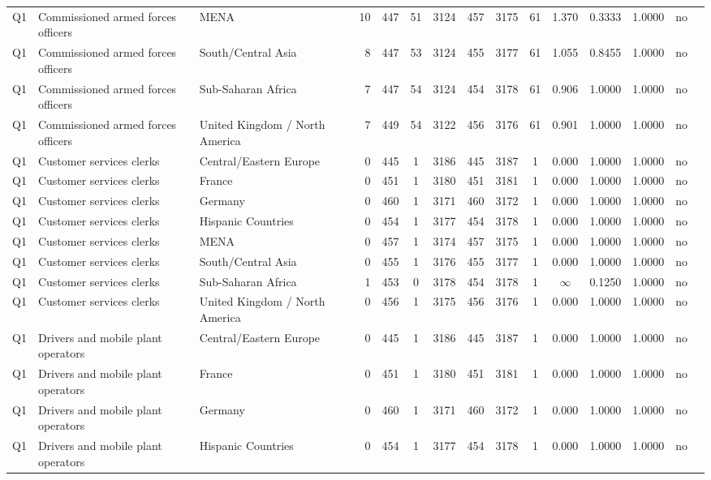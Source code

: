 \begin{longtable}{lllrcccccccccll}
Q1 & Commissioned armed forces officers & MENA & 10 & 447 & 51 & 3124 & 457 & 3175 & 61 & 1.370 & 0.3333 & 1.0000 & no \\
Q1 & Commissioned armed forces officers & South/Central Asia & 8 & 447 & 53 & 3124 & 455 & 3177 & 61 & 1.055 & 0.8455 & 1.0000 & no \\
Q1 & Commissioned armed forces officers & Sub-Saharan Africa & 7 & 447 & 54 & 3124 & 454 & 3178 & 61 & 0.906 & 1.0000 & 1.0000 & no \\
Q1 & Commissioned armed forces officers & United Kingdom / North America & 7 & 449 & 54 & 3122 & 456 & 3176 & 61 & 0.901 & 1.0000 & 1.0000 & no \\
Q1 & Customer services clerks & Central/Eastern Europe & 0 & 445 & 1 & 3186 & 445 & 3187 & 1 & 0.000 & 1.0000 & 1.0000 & no \\
Q1 & Customer services clerks & France & 0 & 451 & 1 & 3180 & 451 & 3181 & 1 & 0.000 & 1.0000 & 1.0000 & no \\
Q1 & Customer services clerks & Germany & 0 & 460 & 1 & 3171 & 460 & 3172 & 1 & 0.000 & 1.0000 & 1.0000 & no \\
Q1 & Customer services clerks & Hispanic Countries & 0 & 454 & 1 & 3177 & 454 & 3178 & 1 & 0.000 & 1.0000 & 1.0000 & no \\
Q1 & Customer services clerks & MENA & 0 & 457 & 1 & 3174 & 457 & 3175 & 1 & 0.000 & 1.0000 & 1.0000 & no \\
Q1 & Customer services clerks & South/Central Asia & 0 & 455 & 1 & 3176 & 455 & 3177 & 1 & 0.000 & 1.0000 & 1.0000 & no \\
Q1 & Customer services clerks & Sub-Saharan Africa & 1 & 453 & 0 & 3178 & 454 & 3178 & 1 & $\infty$ & 0.1250 & 1.0000 & no \\
Q1 & Customer services clerks & United Kingdom / North America & 0 & 456 & 1 & 3175 & 456 & 3176 & 1 & 0.000 & 1.0000 & 1.0000 & no \\
Q1 & Drivers and mobile plant operators & Central/Eastern Europe & 0 & 445 & 1 & 3186 & 445 & 3187 & 1 & 0.000 & 1.0000 & 1.0000 & no \\
Q1 & Drivers and mobile plant operators & France & 0 & 451 & 1 & 3180 & 451 & 3181 & 1 & 0.000 & 1.0000 & 1.0000 & no \\
Q1 & Drivers and mobile plant operators & Germany & 0 & 460 & 1 & 3171 & 460 & 3172 & 1 & 0.000 & 1.0000 & 1.0000 & no \\
Q1 & Drivers and mobile plant operators & Hispanic Countries & 0 & 454 & 1 & 3177 & 454 & 3178 & 1 & 0.000 & 1.0000 & 1.0000 & no \\

\end{longtable}
